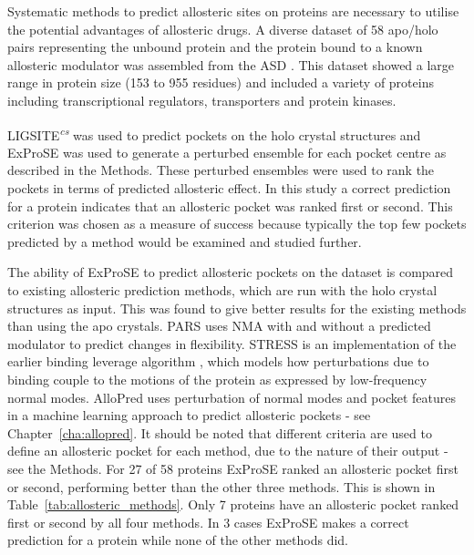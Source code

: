 Systematic methods to predict allosteric sites on proteins are necessary to utilise the potential advantages of allosteric drugs.
A diverse dataset of 58 apo/holo pairs representing the unbound protein and the protein bound to a known allosteric modulator was assembled from the ASD \cite{Shen2016}.
This dataset showed a large range in protein size (153 to 955 residues) and included a variety of proteins including transcriptional regulators, transporters and protein kinases.

LIGSITE\textsuperscript{\it cs} was used to predict pockets on the holo crystal structures and ExProSE was used to generate a perturbed ensemble for each pocket centre as described in the Methods.
These perturbed ensembles were used to rank the pockets in terms of predicted allosteric effect.
In this study a correct prediction for a protein indicates that an allosteric pocket was ranked first or second.
This criterion was chosen as a measure of success because typically the top few pockets predicted by a method would be examined and studied further.

The ability of ExProSE to predict allosteric pockets on the dataset is compared to existing allosteric prediction methods, which are run with the holo crystal structures as input.
This was found to give better results for the existing methods than using the apo crystals.
PARS \cite{Panjkovich2014} uses NMA with and without a predicted modulator to predict changes in flexibility.
STRESS \cite{Clarke2016} is an implementation of the earlier binding leverage algorithm \cite{Mitternacht2011}, which models how perturbations due to binding couple to the motions of the protein as expressed by low-frequency normal modes.
AlloPred \cite{Greener2015} uses perturbation of normal modes and pocket features in a machine learning approach to predict allosteric pockets - see Chapter~\ref{cha:allopred}.
It should be noted that different criteria are used to define an allosteric pocket for each method, due to the nature of their output - see the Methods.
For 27 of 58 proteins ExProSE ranked an allosteric pocket first or second, performing better than the other three methods.
This is shown in Table~\ref{tab:allosteric_methods}.
Only 7 proteins have an allosteric pocket ranked first or second by all four methods.
In 3 cases ExProSE makes a correct prediction for a protein while none of the other methods did.

